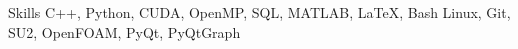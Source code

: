 \begin{rubric}{Skills}
\entry*[Languages]
	C++, Python, CUDA, OpenMP, SQL, MATLAB, \LaTeX, Bash
\entry*[Software]
        Linux, Git, SU2, OpenFOAM, PyQt, PyQtGraph
\end{rubric}
